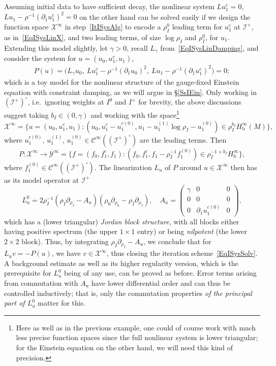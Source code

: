 \documentclass[reqno,11pt,letterpaper]{amsart}
\numberwithin{equation}{section}
\numberwithin{figure}{section}
\theoremstyle{definition}
\theoremstyle{remark}
\newcommand{\mc}{\mathcal}
\newcommand{\cC}{\mc C}
\newcommand{\cX}{\mc X}
\newcommand{\cY}{\mc Y}
\newcommand{\ms}{\mathscr}
\newcommand{\scri}{\ms I}
\newcommand{\pa}{\partial}
\newcommand{\bop}{{\mathrm{b}}}
\newcommand{\CI}{\cC^\infty}
\newcommand{\Hb}{H_{\bop}}
\begin{document}
Assuming initial data to have sufficient decay, the nonlinear system $L u_1^c=0$, $L u_1-\rho^{-1}(\pa_1 u_1^c)^2=0$ on the other hand can be solved easily if we design the function space $\cX^\infty$ in step~\ref{ItISysAlg} to encode a $\rho_I^0$ leading term for $u_1^c$ at $\scri^+$, as in~\eqref{EqISysLinX}, and two leading terms, of size $\log\rho_I$ and $\rho_I^0$, for $u_1$. Extending this model slightly, let $\gamma>0$, recall $L_\gamma$ from~\eqref{EqISysLinDamping}, and consider the system for $u=(u_0,u_1^c,u_1)$,
\begin{equation}
\label{EqISysNull}
\begin{split}
  P(u) = \bigl( L_\gamma u_0,\ L u_1^c-\rho^{-1}(\pa_1 u_0)^2,\ L u_1-\rho^{-1}(\pa_1 u_1^c)^2 \bigr) = 0;
\end{split}
\end{equation}
which is a toy model for the nonlinear structure of the gauge-fixed Einstein equation with constraint damping, as we will argue in \S\ref{SsIEin}. Only working in $(\scri^+)^\circ$, i.e.\ ignoring weights at $I^0$ and $I^+$ for brevity, the above discussions suggest taking $b_I\in(0,\gamma)$ and working with the space\footnote{Here as well as in the previous example, one could of course work with much less precise function spaces since the full nonlinear system is lower triangular; for the Einstein equation on the other hand, we will need this kind of precision.}
\begin{equation}
\label{EqISysNullX}
  \cX^\infty = \{ u=(u_0,u_1^c,u_1) \colon (u_0,u_1^c-u_1^{c(0)},u_1-u_1^{(1)}\log\rho_I-u_1^{(0)}) \in \rho_I^{b_I}\Hb^\infty(M) \},
\end{equation}
where $u_1^{c(0)}$, $u_1^{(1)}$, $u_1^{(0)}\in\CI((\scri^+)^\circ)$ are the leading terms. Then
\[
  P \colon \cX^\infty \to \cY^\infty = \{ f=(f_0,f_1^c,f_1) \colon (f_0,f_1^c,f_1-\rho_I^{-1}f_1^{(0)})\in\rho_I^{-1+b_I}\Hb^\infty \},
\]
where $f_1^{(0)}\in\CI((\scri^+)^\circ)$. The linearization $L_u$ of $P$ around $u\in\cX^\infty$ then has as its model operator at $\scri^+$
\begin{equation}
\label{EqISysNullLin}
  L_u^0 = 2\rho_I^{-1}(\rho_I\pa_{\rho_I}-A_u)(\rho_0\pa_{\rho_0}-\rho_I\pa_{\rho_I}), \quad
  A_u=\begin{pmatrix}
      \gamma & 0 & 0 \\
      0 & 0 & 0 \\
      0 & \pa_1 u_1^{c(0)} & 0
    \end{pmatrix},
\end{equation}
which has a (lower triangular) \emph{Jordan block structure}, with all blocks either having positive spectrum (the upper $1\times 1$ entry) or being \emph{nilpotent} (the lower $2\times 2$ block). Thus, by integrating $\rho_I\pa_{\rho_I}-A_u$, we conclude that for $L_u v=-P(u)$, we have $v\in\cX^\infty$, thus closing the iteration scheme~\eqref{EqISysSolv}. A background estimate as well as its higher regularity version, which is the prerequisite for $L_u^0$ being of any use, can be proved as before. Error terms arising from commutation with $A_u$ have lower differential order and can thus be controlled inductively; that is, only the commutation properties \emph{of the principal part of $L_u^0$} matter for this.
\end{document}

